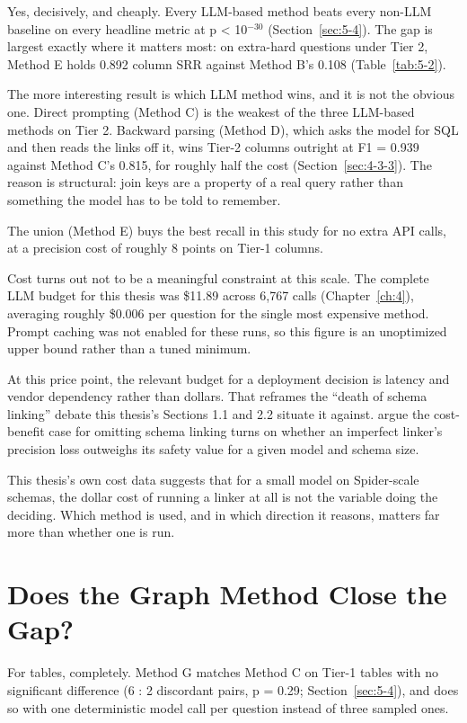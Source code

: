 Yes, decisively, and cheaply. Every LLM-based method beats every non-LLM baseline on every headline metric at p \textless{} 10\ensuremath{^{-30}} (Section~\ref{sec:5-4}). The gap is largest exactly where it matters most: on extra-hard questions under Tier 2, Method E holds 0.892 column SRR against Method B's 0.108 (Table~\ref{tab:5-2}).

The more interesting result is which LLM method wins, and it is not the obvious one. Direct prompting (Method C) is the weakest of the three LLM-based methods on Tier 2. Backward parsing (Method D), which asks the model for SQL and then reads the links off it, wins Tier-2 columns outright at F1 = 0.939 against Method C's 0.815, for roughly half the cost (Section~\ref{sec:4-3-3}). The reason is structural: join keys are a property of a real query rather than something the model has to be told to remember.

The union (Method E) buys the best recall in this study for no extra API calls, at a precision cost of roughly 8 points on Tier-1 columns.

Cost turns out not to be a meaningful constraint at this scale. The complete LLM budget for this thesis was \$11.89 across 6,767 calls (Chapter~\ref{ch:4}), averaging roughly \$0.006 per question for the single most expensive method. Prompt caching was not enabled for these runs, so this figure is an unoptimized upper bound rather than a tuned minimum.

At this price point, the relevant budget for a deployment decision is latency and vendor dependency rather than dollars. That reframes the ``death of schema linking'' debate this thesis's Sections 1.1 and 2.2 situate it against. \citet{maamari2024} argue the cost-benefit case for omitting schema linking turns on whether an imperfect linker's precision loss outweighs its safety value for a given model and schema size.

This thesis's own cost data suggests that for a small model on Spider-scale schemas, the dollar cost of running a linker at all is not the variable doing the deciding. Which method is used, and in which direction it reasons, matters far more than whether one is run.

\section{Does the Graph Method Close the Gap?}\label{sec:6-3}

For tables, completely. Method G matches Method C on Tier-1 tables with no significant difference (6 : 2 discordant pairs, p = 0.29; Section~\ref{sec:5-4}), and does so with one deterministic model call per question instead of three sampled ones.

